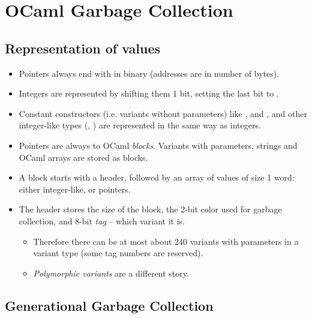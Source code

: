 \documentclass{beamer}
\newcommand{\tmem}[1]{{\em #1\/}}
\newcommand{\tmverbatim}[1]{\text{{\ttfamily{#1}}}}
\begin{document}
\section{OCaml Garbage Collection}

\subsection{Representation of values}

\begin{itemize}
  \item Pointers always end with \tmverbatim{00} in binary (addresses are in
  number of bytes).
  
  \item Integers are represented by shifting them 1 bit, setting the last bit
  to \tmverbatim{1}.
  
  \item Constant constructors (i.e. variants without parameters) like
  \tmverbatim{None}, \tmverbatim{[]} and \tmverbatim{()}, and other
  integer-like types (\tmverbatim{char}, \tmverbatim{bool}) are represented in
  the same way as integers.
  
  \item Pointers are always to OCaml {\tmem{blocks}}. Variants with
  parameters, strings and OCaml arrays are stored as blocks.
  
  \item A block starts with a header, followed by an array of values of size 1
  word: either integer-like, or pointers.
  
  \item The header stores the size of the block, the 2-bit color used for
  garbage collection, and 8-bit {\tmem{tag}} -- which variant it is.
  \begin{itemize}
    \item Therefore there can be at most about 240 variants with parameters in
    a variant type (some tag numbers are reserved).
    
    \item {\tmem{Polymorphic variants}} are a different story.
  \end{itemize}
\end{itemize}

\subsection{Generational Garbage Collection}
\end{document}
